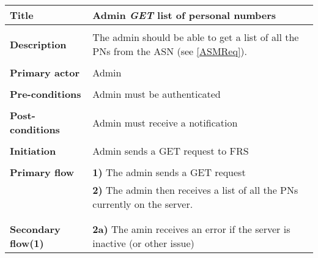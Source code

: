 \documentclass[a4paper,11pt]{article}
\begin{document}

\begin{tabular}{|p{3.5cm}|p{11.5cm}|} \hline
    \textbf{Title} &   Admin \emph{GET} list of personal numbers
        
    \\ \hline \rowcolor{Gray} & \\ \hline
        
    \textbf{Description} &  The admin should be able to get a list of all the PNs from the ASN (see \ref{ASMReq}).
        
    \\ \hline \rowcolor{Gray} & \\ \hline
        
    \textbf{Primary actor} & Admin  
        
    \\ \hline \rowcolor{Gray} & \\ \hline 
          
    \textbf{Pre-conditions} &   Admin must be authenticated
        
    \\ \hline \rowcolor{Gray} & \\ \hline
         
    \textbf{Post-conditions} &   Admin must receive a notification
        
    \\ \hline \rowcolor{Gray} & \\ \hline 
         
    \textbf{Initiation} & Admin sends a GET request to FRS
        
    \\ \hline \rowcolor{Gray} & \\ \hline 
         
    \textbf{Primary flow} & 
    \textbf{1)} The admin sends a GET request \\&
    \textbf{2)} The admin then receives a list of all the PNs currently on the server. \\&
        
    \\ \hline \rowcolor{Gray} & \\ \hline 
         
    \textbf{Secondary flow(1)} & 
    \textbf{2a)} The amin receives an error if the server is inactive (or other issue)
    \\ \hline 
\end{tabular}
\end{document}
